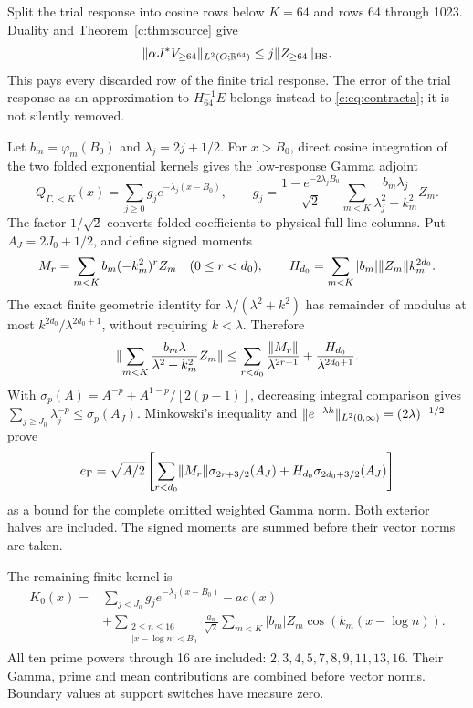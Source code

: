\documentclass[11pt,a4paper]{article}
\numberwithin{equation}{section}
\theoremstyle{definition}\newtheorem{definition}[theorem]{Definition}
\theoremstyle{remark}\newtheorem{remark}[theorem]{Remark}
\newcommand{\R}{\mathbb R}\newcommand{\C}{\mathbb C}\newcommand{\N}{\mathbb N}
\begin{document}
Split the trial response into cosine rows below $K=64$ and rows
64 through 1023. Duality and Theorem~\ref{c:thm:source} give
\begin{equation}\label{c:eq:highrow}
 \norm{\alpha\J^*\V_{\ge64}}_{L^2(O;\R^{64})}
 \le j\norm{Z_{\ge64}}_{\rm HS}.
\end{equation}
This pays every discarded row of the finite trial response. The error
of the trial response as an approximation to $H_{64}^{-1}E$ belongs instead
to \eqref{c:eq:contracta}; it is not silently removed.

Let $b_m=\varphi_m({B_0})$ and $\lambda_j=2j+1/2$.
For $x>{B_0}$, direct cosine integration of the two folded exponential
kernels gives the low-response Gamma adjoint
\begin{equation}\label{c:eq:Qgamma}
 Q_{\Gamma,<K}(x)=\sum_{j\ge0}g_je^{-\lambda_j(x-{B_0})},\qquad
 g_j=\frac{1-e^{-2\lambda_jB_0}}{\sqrt2}
       \sum_{m<K}\frac{b_m\lambda_j}{\lambda_j^2+k_m^2}Z_m.
\end{equation}
The factor $1/\sqrt2$ converts folded coefficients to physical
full-line columns. Put $A_J=2J_0+1/2$, and define signed moments
\[
 M_r=\sum_{m<K}b_m(-k_m^2)^rZ_m\quad(0\le r<d_0),\qquad
 H_{d_0}=\sum_{m<K}|b_m|\lVert Z_m\rVert k_m^{2d_0}.
\]
The exact finite geometric identity for
$\lambda/(\lambda^2+k^2)$ has remainder of modulus at most
$k^{2d_0}/\lambda^{2d_0+1}$, without requiring $k<\lambda$.
Therefore
\[
 \lVert\sum_{m<K}\frac{b_m\lambda}{\lambda^2+k_m^2}Z_m\rVert
 \le\sum_{r<d_0}\frac{\lVert M_r\rVert}{\lambda^{2r+1}}
       +\frac{H_{d_0}}{\lambda^{2d_0+1}}.
\]
With $\sigma_p(A)=A^{-p}+A^{1-p}/[2(p-1)]$, decreasing integral
comparison gives $\sum_{j\ge J_0}\lambda_j^{-p}\le\sigma_p(A_J)$.
Minkowski's inequality and
$\lVert e^{-\lambda h}\rVert_{L^2(0,\infty)}=(2\lambda)^{-1/2}$ prove
\begin{equation}\label{c:eq:egamma}
 e_\Gamma=\sqrt{A/2}\left[
 \sum_{r<d_0}\lVert M_r\rVert\sigma_{2r+3/2}(A_J)
 +H_{d_0}\sigma_{2d_0+3/2}(A_J)\right]
\end{equation}
as a bound for the complete omitted weighted Gamma norm. Both
exterior halves are included. The signed moments are summed before
their vector norms are taken.

The remaining finite kernel is
\begin{equation}\label{c:eq:K0}
 \begin{split}
 K_0(x)={}&\sum_{j<J_0}g_je^{-\lambda_j(x-{B_0})}-ac(x)\\
 &+\sum_{\substack{2\le n\le16\\|x-\log n|<{B_0}}}
  \frac{a_n}{\sqrt2}\sum_{m<K}|b_m|Z_m\cos(k_m(x-\log n)).
 \end{split}
\end{equation}
All ten prime powers through 16 are included:
$2,3,4,5,7,8,9,11,13,16$. Their Gamma, prime and mean contributions
are combined before vector norms. Boundary values at support switches
have measure zero.
\end{document}
